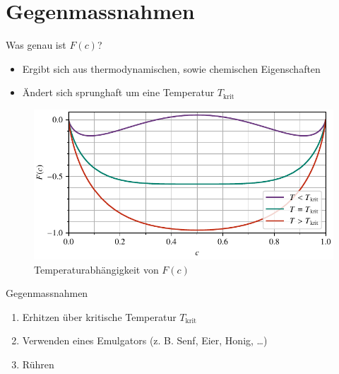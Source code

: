 
\section{Gegenmassnahmen}

\begin{frame}{Was genau ist $F(c)$?}
\begin{itemize}
\item Ergibt sich aus thermodynamischen,
sowie chemischen Eigenschaften
\item Ändert sich \glqq sprunghaft\grqq{} um eine Temperatur $T_\text{krit}$
\end{itemize}
\begin{figure}
\centering
\includegraphics[scale=0.8]{images/energy}
\caption{Temperaturabhängigkeit von $F(c)$}
\label{fig:fc}
\end{figure}
\end{frame}

\begin{frame}{Gegenmassnahmen}
\begin{enumerate}
\item<+-> Erhitzen über kritische Temperatur $T_\text{krit}$
\item<+-> Verwenden eines Emulgators (z. B. Senf, Eier, Honig, \ldots)
\item<+-> Rühren
\end{enumerate}
\end{frame}

